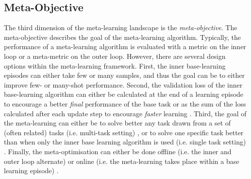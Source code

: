 \subsection{Meta-Objective}
The third dimension of the meta-learning landscape is the \emph{meta-objective}.
The meta-objective describes the goal of the meta-learning algorithm.
Typically, the performance of a meta-learning algorithm is evaluated with a metric on the inner loop or a meta-metric on the outer loop.
However, there are several design options within the meta-learning framework.
First, the inner base-learning episodes can either take few  or many  samples, and thus the goal can be to either improve few- or many-shot performance.
Second, the validation loss of the inner base-learning algorithm can either be calculated at the end of a learning episode to encourage a better \emph{final} performance of the base task or as the sum of the loss calculated after each update step to encourage \emph{faster} learning \cite{antoniou2018how}.
Third, the goal of the meta-learning can either be to solve better any task drawn from a set of (often related) tasks (i.e. multi-task setting) , or to solve one specific task better than when only the inner base learning algorithm is used (i.e. single task setting) .
Finally, the meta-optimisation can either be done offline (i.e. the inner and outer loop alternate)  or online (i.e. the meta-learning takes place within a base learning episode) \cite{li2019feature}.
















